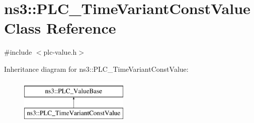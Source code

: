 \hypertarget{classns3_1_1PLC__TimeVariantConstValue}{\section{ns3\-:\-:\-P\-L\-C\-\_\-\-Time\-Variant\-Const\-Value \-Class \-Reference}
\label{classns3_1_1PLC__TimeVariantConstValue}
}


{\ttfamily \#include $<$plc-\/value.\-h$>$}

\-Inheritance diagram for ns3\-:\-:\-P\-L\-C\-\_\-\-Time\-Variant\-Const\-Value\-:\begin{figure}[H]
\begin{center}
\leavevmode
\includegraphics[height=2.000000cm]{classns3_1_1PLC__TimeVariantConstValue}
\end{center}
\end{figure}
